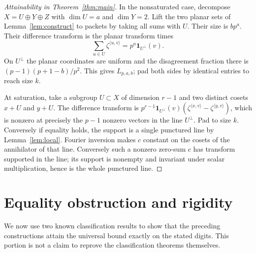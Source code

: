 \documentclass[11pt]{article}
\theoremstyle{remark}\newtheorem{remark}[theorem]{Remark}
\newcommand{\ind}{\mathbf 1}
\begin{document}
\begin{proof}[Attainability in Theorem~\ref{thm:main}]
In the nonsaturated case, decompose $X=U\oplus Y\oplus Z$ with $\dim U=a$ and $\dim Y=2$. Lift the two planar sets of Lemma~\ref{lem:construct} to packets by taking all sums with $U$. Their size is $bp^a$. Their difference transform is the planar transform times
\[
 \sum_{u\in U}\zeta^{\langle u,v\rangle}=p^a\ind_{U^\perp}(v).
\]
On $U^\perp$ the planar coordinates are uniform and the disagreement fraction there is $(p-1)(p+1-b)/p^2$. This gives $L_{p,a,b}$; pad both sides by identical entries to reach size $k$.

At saturation, take a subgroup $U\subset X$ of dimension $r-1$ and two distinct cosets $x+U$ and $y+U$. The difference transform is $p^{r-1}\ind_{U^\perp}(v)(\zeta^{\langle x,v\rangle}-\zeta^{\langle y,v\rangle})$, which is nonzero at precisely the $p-1$ nonzero vectors in the line $U^\perp$. Pad to size $k$. Conversely if equality holds, the support is a single punctured line by Lemma~\ref{lem:local}. Fourier inversion makes $c$ constant on the cosets of the annihilator of that line. Conversely such a nonzero zero-sum $c$ has transform supported in the line; its support is nonempty and invariant under scalar multiplication, hence is the whole punctured line.
\end{proof}

\section{Equality obstruction and rigidity}
We now use two known classification results to show that the preceding constructions attain the universal bound exactly on the stated digits. This portion is not a claim to reprove the classification theorems themselves.
\end{document}
